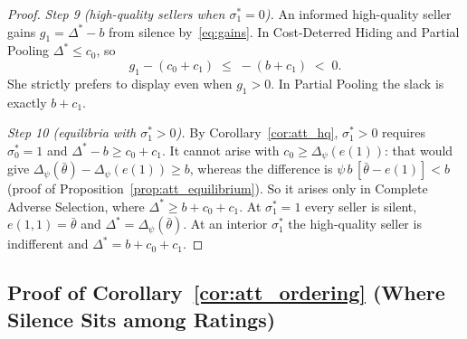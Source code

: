 \begin{proof}
\emph{Step 9 (high-quality sellers when $\sigma_1^*=0$).} An informed high-quality seller gains $g_1=\Delta^*-b$ from silence by~\eqref{eq:gains}. In Cost-Deterred Hiding and Partial Pooling $\Delta^*\le c_0$, so
\begin{equation*}
    g_1-(c_0+c_1)\;\le\;-(b+c_1)\;<\;0 .
\end{equation*}
She strictly prefers to display even when $g_1>0$. In Partial Pooling the slack is exactly $b+c_1$.

\emph{Step 10 (equilibria with $\sigma_1^*>0$).} By Corollary~\ref{cor:att_hq}, $\sigma_1^*>0$ requires $\sigma_0^*=1$ and $\Delta^*-b\ge c_0+c_1$. It cannot arise with $c_0\ge\Delta_\psi(e(1))$: that would give $\Delta_\psi(\bar\theta)-\Delta_\psi(e(1))\ge b$, whereas the difference is $\psi\,b\,[\bar\theta-e(1)]<b$ (proof of Proposition~\ref{prop:att_equilibrium}). So it arises only in Complete Adverse Selection, where $\Delta^*\ge b+c_0+c_1$. At $\sigma_1^*=1$ every seller is silent, $e(1,1)=\bar\theta$ and $\Delta^*=\Delta_\psi(\bar\theta)$. At an interior $\sigma_1^*$ the high-quality seller is indifferent and $\Delta^*=b+c_0+c_1$.
\end{proof}

\subsection*{Proof of Corollary~\ref{cor:att_ordering} (Where Silence Sits among Ratings)}

